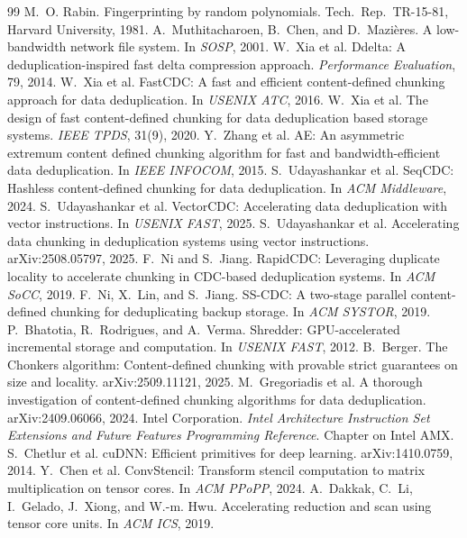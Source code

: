 \documentclass[10pt,twocolumn]{article}
\begin{document}
\small
\begin{thebibliography}{99}\setlength\itemsep{1pt}
 M.~O. Rabin. Fingerprinting by random polynomials. Tech.\ Rep.\ TR-15-81, Harvard University, 1981.
 A.~Muthitacharoen, B.~Chen, and D.~Mazi\`eres. A low-bandwidth network file system. In \emph{SOSP}, 2001.
 W.~Xia et al. Ddelta: A deduplication-inspired fast delta compression approach. \emph{Performance Evaluation}, 79, 2014.
 W.~Xia et al. FastCDC: A fast and efficient content-defined chunking approach for data deduplication. In \emph{USENIX ATC}, 2016.
 W.~Xia et al. The design of fast content-defined chunking for data deduplication based storage systems. \emph{IEEE TPDS}, 31(9), 2020.
 Y.~Zhang et al. AE: An asymmetric extremum content defined chunking algorithm for fast and bandwidth-efficient data deduplication. In \emph{IEEE INFOCOM}, 2015.
 S.~Udayashankar et al. SeqCDC: Hashless content-defined chunking for data deduplication. In \emph{ACM Middleware}, 2024.
 S.~Udayashankar et al. VectorCDC: Accelerating data deduplication with vector instructions. In \emph{USENIX FAST}, 2025.
 S.~Udayashankar et al. Accelerating data chunking in deduplication systems using vector instructions. arXiv:2508.05797, 2025.
 F.~Ni and S.~Jiang. RapidCDC: Leveraging duplicate locality to accelerate chunking in CDC-based deduplication systems. In \emph{ACM SoCC}, 2019.
 F.~Ni, X.~Lin, and S.~Jiang. SS-CDC: A two-stage parallel content-defined chunking for deduplicating backup storage. In \emph{ACM SYSTOR}, 2019.
 P.~Bhatotia, R.~Rodrigues, and A.~Verma. Shredder: GPU-accelerated incremental storage and computation. In \emph{USENIX FAST}, 2012.
 B.~Berger. The Chonkers algorithm: Content-defined chunking with provable strict guarantees on size and locality. arXiv:2509.11121, 2025.
 M.~Gregoriadis et al. A thorough investigation of content-defined chunking algorithms for data deduplication. arXiv:2409.06066, 2024.
 Intel Corporation. \emph{Intel Architecture Instruction Set Extensions and Future Features Programming Reference}. Chapter on Intel AMX.
 S.~Chetlur et al. cuDNN: Efficient primitives for deep learning. arXiv:1410.0759, 2014.
 Y.~Chen et al. ConvStencil: Transform stencil computation to matrix multiplication on tensor cores. In \emph{ACM PPoPP}, 2024.
 A.~Dakkak, C.~Li, I.~Gelado, J.~Xiong, and W.-m. Hwu. Accelerating reduction and scan using tensor core units. In \emph{ACM ICS}, 2019.

\end{thebibliography}
\end{document}

